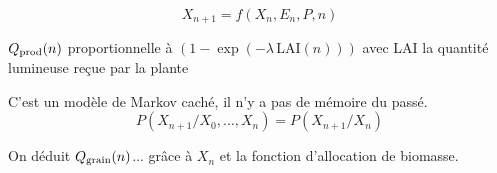 \begin{equation}
  X_{n+1} = f(X_n,E_n,P,n)
\end{equation} 

$Q_{\text{prod}}(n)$ proportionnelle à $(1-\exp{(-\lambda \, \text{LAI}(n))})$ 
avec LAI la quantité lumineuse reçue par la plante

C’est un modèle de Markov caché, il n'y a pas de mémoire du passé.
\[
  P(X_{n+1}/X_0,…,X_n) = P(X_{n+1} / X_n) 
\] 

On déduit $Q_{\text{grain}}(n)$... grâce à $X_n$ et la fonction d'allocation de biomasse.


